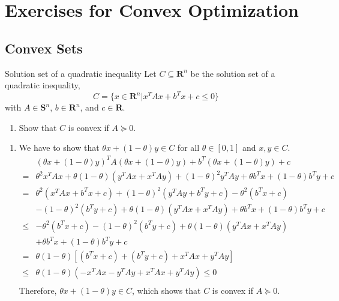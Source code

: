 \chapter{Exercises for Convex Optimization}

\section{Convex Sets}

\begin{exercise}{Solution set of a quadratic inequality}
    Let $C\subseteq\mathbf{R}^{n}$ be the solution set of a quadratic inequality,
    \begin{equation*}
        C=\{x\in\mathbf{R}^{n}\vert x^{T}Ax+b^{T}x+c\leq 0\}
    \end{equation*}
    with $A\in\mathbf{S}^{n}$, $b\in\mathbf{R}^{n}$, and $c\in\mathbf{R}$.
    \begin{enumerate}
        \item Show that $C$ is convex if $A\succeq 0$.
    \end{enumerate}
\end{exercise}

\begin{solution}
    \begin{enumerate}
        \item
              We have to show that $\theta x+(1-\theta)y\in C$ for all $\theta\in[0,1]$ and $x,y\in C$.
              \begin{equation*}
                  \begin{aligned}
                           & (\theta x+(1-\theta)y)^{T}A(\theta x+(1-\theta)y)+b^{T}(\theta x+(1-\theta)y)+c            \\
                      =    & \theta^2x^TAx+\theta(1-\theta)(y^TAx+x^TAy)+(1-\theta)^2y^TAy+\theta b^Tx+(1-\theta)b^Ty+c \\
                      =    & \theta^2(x^{T}Ax+b^{T}x+c)+(1-\theta)^2(y^{T}Ay+b^{T}y+c)-\theta^2(b^{T}x+c)               \\
                           & -(1-\theta)^2(b^{T}y+c)+\theta(1-\theta)(y^TAx+x^TAy)+\theta b^Tx+(1-\theta)b^Ty+c         \\
                      \leq & -\theta^2(b^{T}x+c)-(1-\theta)^2(b^{T}y+c)+\theta(1-\theta)(y^TAx+x^TAy)                   \\
                           & +\theta b^Tx+(1-\theta)b^Ty+c                                                              \\
                      =    & \theta(1-\theta)[(b^Tx+c)+(b^Ty+c)+x^TAx+y^TAy]                                            \\
                      \leq & \theta(1-\theta)(-x^TAx-y^TAy+x^TAx+y^TAy)\leq 0                                           \\
                  \end{aligned}
              \end{equation*}
              Therefore, $\theta x+(1-\theta)y\in C$, which shows that $C$ is convex if $A\succeq 0$.
    \end{enumerate}

\end{solution}